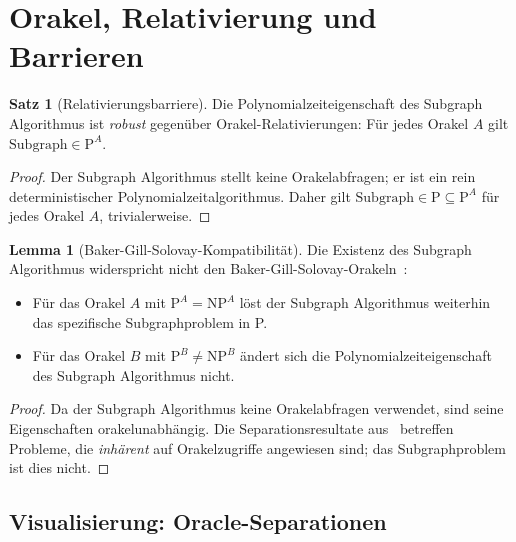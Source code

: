 ﻿\documentclass[a4paper,12pt]{article}
\theoremstyle{definition}
\newtheorem{satz}{Satz}
\newtheorem{lemma}{Lemma}
\begin{document}
\section{Orakel, Relativierung und Barrieren}
\label{sec:oracle}

\begin{satz}[Relativierungsbarriere]
\label{satz:oracle}
  Die Polynomialzeiteigenschaft des Subgraph Algorithmus ist \emph{robust}
  gegenüber Orakel-Relativierungen: Für jedes Orakel $A$ gilt
  $\mathrm{Subgraph} \in \mathrm{P}^A$.
\end{satz}

\begin{proof}
  Der Subgraph Algorithmus stellt keine Orakelabfragen; er ist ein rein
  deterministischer Polynomialzeitalgorithmus.
  Daher gilt $\mathrm{Subgraph} \in \mathrm{P} \subseteq \mathrm{P}^A$
  für jedes Orakel $A$, trivialerweise.
\end{proof}

\begin{lemma}[Baker-Gill-Solovay-Kompatibilität]
  Die Existenz des Subgraph Algorithmus widerspricht nicht den
  Baker-Gill-Solovay-Orakeln~\cite{baker1975relativizations}:
  \begin{itemize}
    \item Für das Orakel $A$ mit $\mathrm{P}^A = \mathrm{NP}^A$ löst der
          Subgraph Algorithmus weiterhin das spezifische Subgraphproblem in P.
    \item Für das Orakel $B$ mit $\mathrm{P}^B \neq \mathrm{NP}^B$ ändert
          sich die Polynomialzeiteigenschaft des Subgraph Algorithmus nicht.
  \end{itemize}
\end{lemma}

\begin{proof}
  Da der Subgraph Algorithmus keine Orakelabfragen verwendet, sind seine
  Eigenschaften orakelunabhängig. Die Separationsresultate aus~\cite{baker1975relativizations}
  betreffen Probleme, die \emph{inhärent} auf Orakelzugriffe angewiesen sind;
  das Subgraphproblem ist dies nicht.
\end{proof}

\subsection{Visualisierung: Oracle-Separationen}
\label{sec:plot5}
\end{document}
